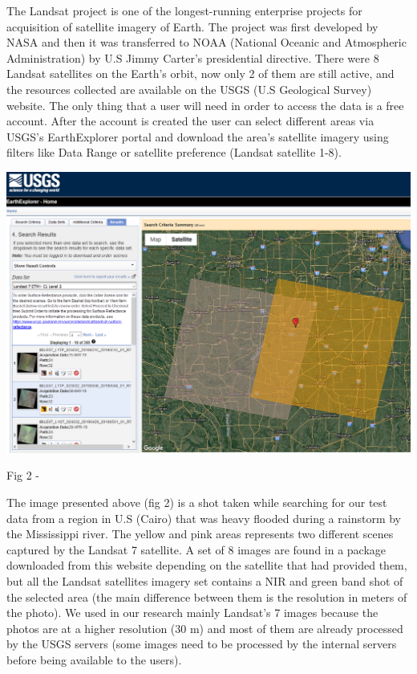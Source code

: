 \documentclass[12pt, a4paper]{report}
\begin{document}
\par 
The Landsat project is one of the longest-running enterprise projects for acquisition of satellite imagery of Earth. The project was first developed by NASA and then it was transferred to NOAA (National Oceanic and Atmospheric Administration) by U.S Jimmy Carter's presidential directive. There were 8 Landsat satellites on the Earth's orbit, now only 2 of them are still active, and the resources collected are available on the USGS (U.S Geological Survey) website. The only thing that a user will need in order to access the data is a free account. After the account is created the user can select different areas via USGS's EarthExplorer portal and download the area's satellite imagery using filters like Data Range or satellite preference (Landsat satellite 1-8).
\par

\bigskip

\includegraphics[scale=0.5, right]{landsat_search.png} 
\begin{center}
Fig 2 - \cite{USGS}
\end{center}

The image presented above (fig 2) is a shot taken while searching for our test data from a region in U.S (Cairo) that was heavy flooded during a rainstorm by the Mississippi river. The yellow and pink areas represents two different scenes captured by the Landsat 7 satellite. A set of 8 images are found in a package downloaded from this website depending on the satellite that had provided them, but all the Landsat satellites imagery set contains a NIR and green band shot of the selected area (the main difference between them is the resolution in meters of the photo). We used in our research mainly Landsat's 7 images because the photos are at a higher resolution (30 m) and most of them are already processed by the USGS servers (some images need to be processed by the internal servers before being available to the users).
\end{document}
